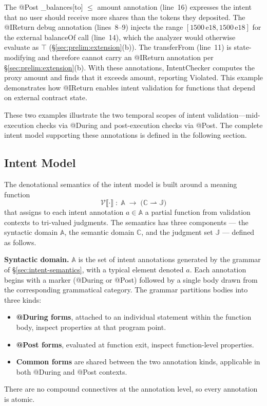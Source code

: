 \documentclass[pdflatex,sn-basic]{sn-jnl}%
\theoremstyle{thmstyleone}%
\theoremstyle{thmstyletwo}%
\theoremstyle{thmstylethree}%
\begin{document}
The @Post \_balances[to] $\leq$ amount annotation (line~16) expresses the intent that no user should receive more shares than the tokens they deposited.
The @IReturn debug annotation (lines~8--9) injects the range $[1500\,\text{e}18, 1500\,\text{e}18]$ for the external balanceOf call (line~14), which the analyzer would otherwise evaluate as $\top$ (§\ref{sec:prelim:extension}(b)).
The transferFrom (line~11) is state-modifying and therefore cannot carry an @IReturn annotation per §\ref{sec:prelim:extension}(b).
With these annotations, IntentChecker computes the proxy amount and finds that it exceeds amount, reporting Violated.
This example demonstrates how @IReturn enables intent validation for functions that depend on external contract state.

\smallskip
These two examples illustrate the two temporal scopes of intent validation---mid-execution checks via @During and post-execution checks via @Post.
The complete intent model supporting these annotations is defined in the following section.

\subsection{Intent Model}\label{sec:intent-model}

The denotational semantics of the intent model is built around a meaning function
\[
\mathcal{V}\llbracket \cdot \rrbracket \;\colon\; \mathbb{A} \;\to\; \bigl(\mathbb{C} \rightharpoonup \mathbb{J}\bigr)
\]
that assigns to each intent annotation $a \in \mathbb{A}$ a partial function from validation contexts to tri-valued judgments. The semantics has three components --- the syntactic domain $\mathbb{A}$, the semantic domain $\mathbb{C}$, and the judgment set $\mathbb{J}$ --- defined as follows.

\smallskip
\noindent\textbf{Syntactic domain.}
$\mathbb{A}$ is the set of intent annotations generated by the grammar of §\ref{sec:intent-semantics}, with a typical element denoted $a$.
Each annotation begins with a marker (@During or @Post) followed by a single body drawn from the corresponding grammatical category.
The grammar partitions bodies into three kinds:
\begin{itemize}
    \item \textbf{@During forms}, attached to an individual statement within the function body, inspect properties at that program point.
    \item \textbf{@Post forms}, evaluated at function exit, inspect function-level properties.
    \item \textbf{Common forms} are shared between the two annotation kinds, applicable in both @During and @Post contexts.
\end{itemize}
There are no compound connectives at the annotation level, so every annotation is atomic.
\end{document}
